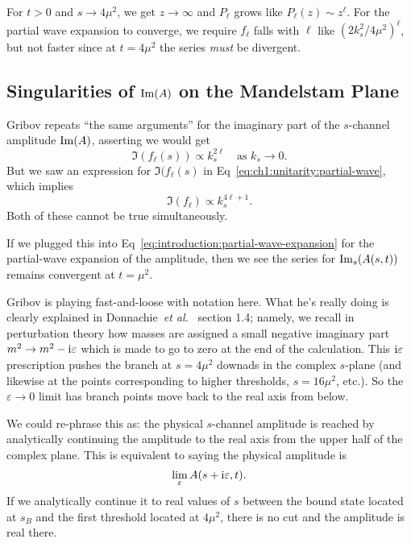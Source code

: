 \M
For $t>0$ and $s\to4\mu^{2}$, we get $z\to\infty$ and $P_{\ell}$ grows
like $P_{\ell}(z)\sim z^{\ell}$. For the partial wave expansion to
converge, we require $f_{\ell}$ falls with $\ell$ like
$(2k_{s}^{2}/4\mu^{2})^{\ell}$, but not faster since at $t=4\mu^{2}$ the
series \emph{must} be divergent.

\smallbreak
\subsection{Singularities of \texorpdfstring{$\operatorname{Im}(A)$}{Im(A)} on the Mandelstam Plane}

 Gribov repeats ``the same arguments'' for the imaginary part of
the $s$-channel amplitude $\operatorname{Im}(A)$, asserting we would get
\begin{equation}
\Im(f_{\ell}(s))\propto k_{s}^{2\ell}\quad\mbox{as } k_{s}\to0.
\end{equation}
But we saw an expression for $\Im(f_{\ell}(s)$ in Eq~\eqref{eq:ch1:unitarity:partial-wave},
which implies
\begin{equation}
\Im(f_{\ell})\propto k_{s}^{4\ell+1}.
\end{equation}
Both of these cannot be true simultaneously.

\M
If we plugged this into Eq~\eqref{eq:introduction:partial-wave-expansion}
for the partial-wave expansion of the amplitude, then we see the series
for $\operatorname{Im}_{s}(A(s,t))$ remains convergent at $t=\mu^{2}$.

Gribov is playing fast-and-loose with notation here. What he's really
doing is clearly explained in Donnachie~\textit{et al.}~\cite{Donnachie:2002en}
section 1.4; namely, we recall in perturbation theory how masses are
assigned a small negative imaginary part $m^{2}\to m^{2}-\mathrm{i}\varepsilon$
which is made to go to zero at the end of the calculation.
This $\mathrm{i}\varepsilon$ prescription pushes the branch at $s=4\mu^{2}$
downads in the complex $s$-plane (and likewise at the points
corresponding to higher thresholds, $s=16\mu^{2}$, etc.). So the
$\varepsilon\to0$ limit has branch points move back to the real axis
from below.

We could re-phrase this as: the physical $s$-channel amplitude is reached
by analytically continuing the amplitude to the real axis from the upper
half of the complex plane. This is equivalent to saying the physical
amplitude is
\begin{equation}
\lim_{\varepsilon}A(s+\mathrm{i}\varepsilon,t).
\end{equation}
If we analytically continue it to real values of $s$ between the bound
state located at $s_{B}$ and the first threshold located at $4\mu^{2}$,
there is no cut and the amplitude is real there.

